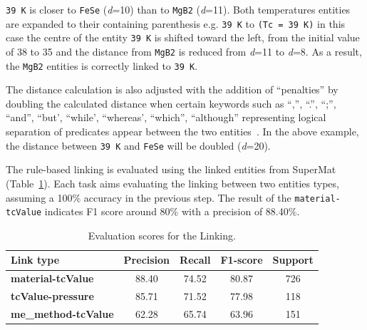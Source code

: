 \documentclass[]{interact}
\theoremstyle{plain}%
\theoremstyle{definition}
\theoremstyle{remark}
\newcommand{\tc}{T$_{c}$}
\begin{document}
\texttt{39 K} is closer to \texttt{FeSe} (\textit{d}=10) than to \texttt{MgB2} (\textit{d}=11).
Both temperatures entities are expanded to their containing parenthesis e.g. \texttt{39 K} to \texttt{(Tc = 39 K)} in this case the centre of the entity \texttt{39 K} is shifted toward the left, from the initial value of 38 to 35 and the distance from \texttt{MgB2} is reduced from \textit{d}=11 to \textit{d}=8. 
As a result, the \texttt{MgB2} entities is correctly linked to \texttt{39 K}. 

The distance calculation is also adjusted with the addition of ``penalties'' by doubling the calculated distance when certain keywords such as ``,'', ``.'', ``;'', ``and'', ``but', ``while', ``whereas', ``which'', ``although'' representing logical separation of predicates appear between the two entities~\cite{oka2021table}. 
In the above example, the distance between \texttt{39 K} and \texttt{FeSe} will be doubled (\textit{d}=20).

The rule-based linking is evaluated using the linked entities from SuperMat~\cite{foppiano2021supermat} (Table~\ref{table:evaluation-linking}). 
Each task aims evaluating the linking between two entities types, assuming a 100\% accuracy in the previous step. 
The result of the \texttt{material-tcValue} indicates F1 score around 80\% with a precision of 88.40\%.

\begin{table}[ht]
\centering\small
\begin{tabular}{lcccc}
\toprule 
\textbf{Link type} & \textbf{Precision} & \textbf{Recall} & \textbf{F1-score} & Support \\ 
\midrule
\textbf{material-tcValue}      &  88.40    & 74.52 &    80.87 &   726  \\
\textbf{tcValue-pressure}      & 85.71  &  71.52  &  77.98  &  118     \\
\textbf{me\_method-tcValue}    & 62.28 & 65.74 &  63.96  &  151 \\
\bottomrule
\end{tabular}
\caption{\label{table:evaluation-linking} Evaluation scores for the Linking. }
\end{table}
\end{document}
